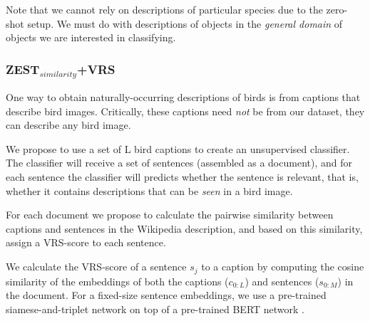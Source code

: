 \documentclass[11pt,a4paper]{article}
\begin{document}
Note that we cannot rely on descriptions of particular species due to the zero-shot setup. We must do with descriptions of objects in the {\em general domain} %
of objects we are interested in classifying. 

\subsubsection{ZEST$_{similarity}$+VRS}
One way to obtain naturally-occurring descriptions of birds is from captions that describe bird images. Critically, these captions need {\em not} be from our dataset, they can describe any bird image. 

We propose to use a set of L bird captions to create an unsupervised classifier. The classifier will receive a set of sentences (assembled as a document), and for each sentence the classifier will predicts whether the sentence is relevant, that is, whether it contains descriptions that can be {\em seen} in a bird image.

For each document we propose to calculate the pairwise similarity between captions and sentences in the Wikipedia description, and based on this similarity, assign a VRS-score to each sentence.



We calculate the VRS-score of a sentence $s_j$ to a caption by computing the cosine similarity of the embeddings of both the captions ($c_{0:L}$) and sentences ($s_{0:M}$) in the document. For a fixed-size sentence embeddings, we use a pre-trained siamese-and-triplet network \citep{reimers2019sentence, Schroff_2015_CVPR} on top of a pre-trained BERT network \cite{devlin2019bert}.

\end{document}

